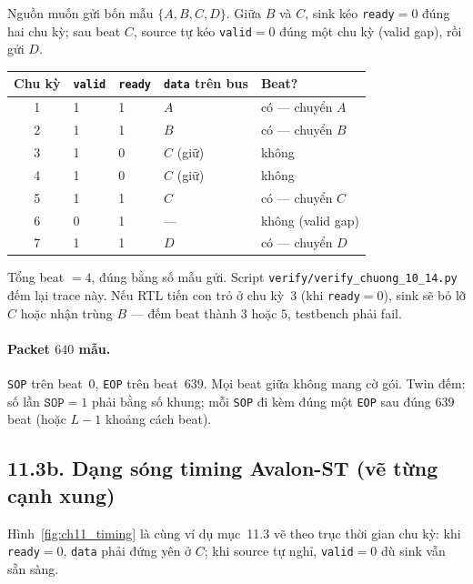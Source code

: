 Nguồn muốn gửi bốn mẫu $\{A,B,C,D\}$. Giữa $B$ và $C$, sink kéo \texttt{ready}$=0$ đúng hai chu kỳ; sau beat $C$, source tự kéo \texttt{valid}$=0$ đúng một chu kỳ (valid gap), rồi gửi $D$.

\begin{center}\small
\begin{tabular}{@{}cllll@{}}\toprule
Chu kỳ & \texttt{valid} & \texttt{ready} & \texttt{data} trên bus & Beat? \\
\midrule
1 & 1 & 1 & $A$ & có --- chuyển $A$ \\
2 & 1 & 1 & $B$ & có --- chuyển $B$ \\
3 & 1 & 0 & $C$ (giữ) & không \\
4 & 1 & 0 & $C$ (giữ) & không \\
5 & 1 & 1 & $C$ & có --- chuyển $C$ \\
6 & 0 & 1 & --- & không (valid gap) \\
7 & 1 & 1 & $D$ & có --- chuyển $D$ \\
\bottomrule
\end{tabular}
\end{center}

Tổng beat $=4$, đúng bằng số mẫu gửi. Script \texttt{verify/verify\_chuong\_10\_14.py} đếm lại trace này. Nếu RTL tiến con trỏ ở chu kỳ~3 (khi \texttt{ready}$=0$), sink sẽ bỏ lỡ $C$ hoặc nhận trùng $B$ --- đếm beat thành $3$ hoặc $5$, testbench phải fail.

\paragraph{Packet $640$ mẫu.} \texttt{SOP} trên beat~$0$, \texttt{EOP} trên beat~$639$. Mọi beat giữa không mang cờ gói. Twin đếm: số lần $\texttt{SOP}=1$ phải bằng số khung; mỗi \texttt{SOP} đi kèm đúng một \texttt{EOP} sau đúng $639$ beat (hoặc $L-1$ khoảng cách beat).


\subsection*{11.3b. Dạng sóng timing Avalon-ST (vẽ từng cạnh xung)}

Hình~\ref{fig:ch11_timing} là cùng ví dụ mục~11.3 vẽ theo trục thời gian chu kỳ: khi \texttt{ready}$=0$, \texttt{data} phải đứng yên ở $C$; khi source tự nghỉ, \texttt{valid}$=0$ dù sink vẫn sẵn sàng.

